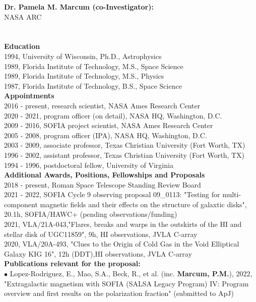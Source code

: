 \textbf{\color{Blue}\large Dr. Pamela M. Marcum (co-Investigator):}\\
NASA ARC\\
\\ \\ \vspace{-1em}
\textbf{Education}\\
1994, University of Wisconsin, Ph.D., Astrophysics\\
1989, Florida Institute of Technology, M.S., Space Science\\
1989, Florida Institute of Technology, M.S., Physics\\
1987, Florida Institute of Technology, B.S., Space Science\\
\textbf{Appointments}\\
2016 - present, research scientist, NASA Ames Research Center\\
2020 - 2021, program officer (on detail), NASA HQ, Washington, D.C.\\
2009 - 2016, SOFIA project scientist, NASA Ames Research Center\\
2005 - 2008, program officer (IPA), NASA HQ, Washington, D.C.\\
2003 - 2009, associate professor, Texas Christian University (Fort Worth, TX)\\
1996 - 2002, assistant professor, Texas Christian University (Fort Worth, TX)\\
1994 - 1996, postdoctoral fellow, University of Virginia\\
\textbf{Additional Awards, Positions, Fellowships and Proposals}\\
2018 - present, Roman Space Telescope Standing Review Board\\
2021 - 2022, SOFIA Cycle 9 observing proposal 09\_0113: "Testing for multi-component magnetic fields and their effects on the structure of galaxtic disks", 20.1h, SOFIA/HAWC+ (pending observations/funding)\\
2021, VLA/21A-043,"Flares, breaks and warps in the outskirts of the HI and stellar disk of UGC11859", 9h, HI observations, JVLA C-array\\
2020, VLA/20A-493, "Clues to the Origin of Cold Gas in the Void Elliptical Galaxy KIG 16", 12h (DDT),HI observations, JVLA C-array\\
\textbf{Publications relevant for the proposal:}\\
{\scriptsize{$\bullet$}} Lopez-Rodriguez, E., Mao, S.A., Beck, R., et al. (inc. \textbf{Marcum, P.M.}), 2022, "Extragalactic magnetism with SOFIA (SALSA Legacy Program) IV: Program overview and first results on the polarization fraction" (submitted to ApJ)\\
